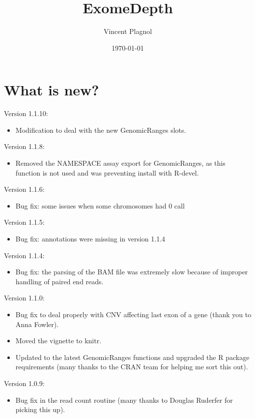 \documentclass[10pt]{article}\usepackage[]{graphicx}\usepackage[]{color}
\title{ExomeDepth}
\author{Vincent Plagnol}
\date{\today}
\begin{document}
\maketitle

\tableofcontents

\section{What is new?}

Version 1.1.10:
\begin{itemize}
\item Modification to deal with the new GenomicRanges slots.
\end{itemize}

Version 1.1.8:
\begin{itemize}
\item Removed the NAMESPACE assay export for GenomicRanges, as this function is not used and was preventing install with R-devel.
\end{itemize}

Version 1.1.6:
\begin{itemize}
\item Bug fix: some issues when some chromosomes had 0 call
\end{itemize}

Version 1.1.5:
\begin{itemize}
\item Bug fix: annotations were missing in version 1.1.4
\end{itemize}

Version 1.1.4:
\begin{itemize}
\item Bug fix: the parsing of the BAM file was extremely slow because of improper handling of paired end reads.
\end{itemize}


Version 1.1.0:
\begin{itemize}
\item Bug fix to deal properly with CNV affecting last exon of a gene (thank you to Anna Fowler).
\item Moved the vignette to knitr.
\item Updated to the latest GenomicRanges functions and upgraded the R package requirements (many thanks to the CRAN team for helping me sort this out).
\end{itemize}

Version 1.0.9:
\begin{itemize}
\item Bug fix in the read count routine (many thanks to Douglas Ruderfer for picking this up).
\end{itemize}
\end{document}
